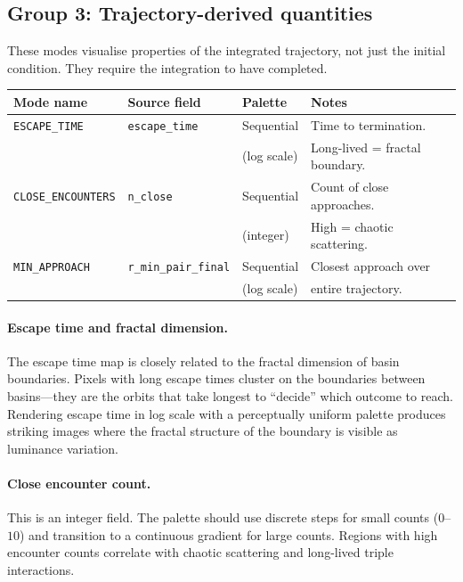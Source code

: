 \documentclass[11pt]{article}
\newcommand{\field}[1]{\texttt{#1}}
\begin{document}
\subsection{Group 3: Trajectory-derived quantities}

These modes visualise properties of the integrated trajectory, not just the
initial condition. They require the integration to have completed.

\begin{center}
\begin{tabular}{llll}
\toprule
Mode name & Source field & Palette & Notes \\
\midrule
\texttt{ESCAPE\_TIME} & \field{escape\_time} & Sequential & Time to termination. \\
 & & (log scale) & Long-lived = fractal boundary. \\
\texttt{CLOSE\_ENCOUNTERS} & \field{n\_close} & Sequential & Count of close approaches. \\
 & & (integer) & High = chaotic scattering. \\
\texttt{MIN\_APPROACH} & \field{r\_min\_pair\_final} & Sequential & Closest approach over \\
 & & (log scale) & entire trajectory. \\
\bottomrule
\end{tabular}
\end{center}

\paragraph{Escape time and fractal dimension.} The escape time map is closely
related to the fractal dimension of basin boundaries. Pixels with long escape
times cluster on the boundaries between basins---they are the orbits that take
longest to ``decide'' which outcome to reach. Rendering escape time in log scale
with a perceptually uniform palette produces striking images where the fractal
structure of the boundary is visible as luminance variation.

\paragraph{Close encounter count.} This is an integer field. The palette should
use discrete steps for small counts ($0$--$10$) and transition to a continuous
gradient for large counts. Regions with high encounter counts correlate with
chaotic scattering and long-lived triple interactions.
\end{document}
